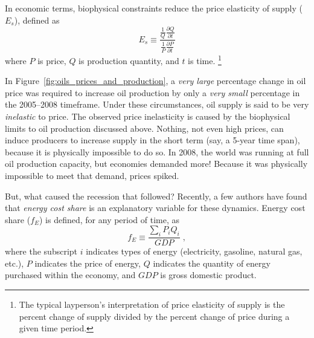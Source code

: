In economic terms, biophysical constraints reduce the 
price elasticity of supply ($E_s$), defined as 
%
\begin{equation} \label{eq:price_elasticity_of_supply}
	E_s \equiv \frac{\frac{1}{Q}\frac{\partial Q}{\partial t}}{\frac{1}{P}\frac{\partial P}{\partial t}}
\end{equation}
%
where $P$ is price, $Q$ is production quantity, and $t$ is time.%
	\footnote{
	The typical layperson's interpretation of price elasticity of supply is the 
	percent change of supply divided by the percent change of price
	during a given time period.
	}

In Figure~\ref{fig:oils_prices_and_production}, 
a \emph{very large} percentage change in oil price was required to 
increase oil production by only a \emph{very small} percentage
in the 2005--2008 timeframe.
Under these circumstances, 
oil supply is said to be very \emph{inelastic} to price.
The observed price inelasticity is caused by 
the biophysical limits to oil production discussed above.
Nothing, not even high prices, can induce producers to 
increase supply in the short term (say, a 5-year time span), 
because it is physically impossible to do so.
In 2008, the world was running at full oil production capacity, 
but economies demanded more!
Because it was physically impossible to meet that demand,
prices spiked.

But, what caused the recession that followed?
Recently, a few authors have found that \emph{energy cost share} 
is an explanatory variable for these dynamics.
Energy cost share ($f_E$) is defined, for any period of time, as
%
\begin{equation}
	f_E \equiv \frac{\displaystyle\sum_i P_i Q_i}{GDP} \; ,
\end{equation}
%
where 
the subscript $i$ indicates types of energy 
(electricity, gasoline, natural gas, etc.),
$P$ indicates the price of energy,
$Q$ indicates the quantity of energy purchased within the economy, and
$GDP$ is gross domestic product.

